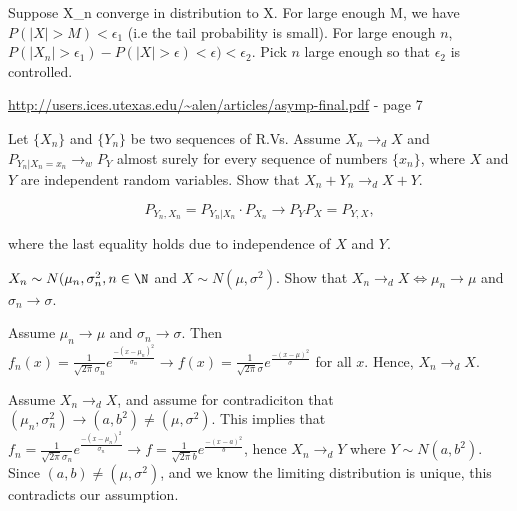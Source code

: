 \documentclass[]{book}
\theoremstyle{definition}
\theoremstyle{definition}
\theoremstyle{definition}
\theoremstyle{remark}
\let\BeginKnitrBlock\begin \let\EndKnitrBlock\end
\begin{document}
\BeginKnitrBlock{solution}[Ex 127 (a)]
\iffalse{} {Solution (Ex 127 (a)). } \fi{}Suppose X\_n converge in
distribution to X. For large enough M, we have
\(P(|X| > M) < \epsilon_1\) (i.e the tail probability is small). For
large enough \(n\),
\(P(|X_n| > \epsilon_1) - P(|X| > \epsilon) < \epsilon) < \epsilon_2\).
Pick \(n\) large enough so that \(\epsilon_2\) is controlled.

\url{http://users.ices.utexas.edu/~alen/articles/asymp-final.pdf} - page
7
\EndKnitrBlock{solution}

\BeginKnitrBlock{exercise}[Ex 128]
\protect\hypertarget{exr:unnamed-chunk-75}{}{\label{exr:unnamed-chunk-75}
\iffalse (Ex 128) \fi{} }
\EndKnitrBlock{exercise}

\BeginKnitrBlock{exercise}[Ex 137]
\protect\hypertarget{exr:unnamed-chunk-76}{}{\label{exr:unnamed-chunk-76}
\iffalse (Ex 137) \fi{} }Let \(\{X_n\}\) and \(\{Y_n\}\) be two
sequences of R.Vs. Assume \(X_n \to_d X\) and
\(P_{Y_n | X_n = x_n} \to_w P_Y\) almost surely for every sequence of
numbers \(\{x_n\}\), where \(X\) and \(Y\) are independent random
variables. Show that \(X_n + Y_n \to_d X + Y\).
\EndKnitrBlock{exercise}

\BeginKnitrBlock{solution}
\iffalse{} {Solution. } \fi{} \[
  P_{Y_n,X_n} = P_{Y_n|X_n}\cdot P_{X_n} \to P_Y P_X = P_{Y,X},
\]

where the last equality holds due to independence of \(X\) and \(Y\).
\EndKnitrBlock{solution}

\BeginKnitrBlock{exercise}[Ex 138]
\protect\hypertarget{exr:unnamed-chunk-78}{}{\label{exr:unnamed-chunk-78}
\iffalse (Ex 138) \fi{} }
\EndKnitrBlock{exercise}

\BeginKnitrBlock{exercise}[Ex 140]
\protect\hypertarget{exr:unnamed-chunk-79}{}{\label{exr:unnamed-chunk-79}
\iffalse (Ex 140) \fi{} }\(X_n \sim N(\mu_n, \sigma^2_n, n \in \N\) and
\(X \sim N(\mu, \sigma^2)\). Show that
\(X_n \to_d X \iff \mu_n \to \mu\) and \(\sigma_n \to \sigma\).
\EndKnitrBlock{exercise}

\BeginKnitrBlock{solution}
\iffalse{} {Solution. } \fi{}Assume \(\mu_n \to \mu\) and
\(\sigma_n \to \sigma\). Then
\(f_n(x) = \frac{1}{\sqrt{2\pi}\sigma_n}e^{\tfrac{-(x-\mu_n)^2}{\sigma_n}} \to f(x) = \frac{1}{\sqrt{2\pi}\sigma}e^{\tfrac{-(x-\mu)^2}{\sigma}}\)
for all \(x\). Hence, \(X_n \to_d X\).

Assume \(X_n \to_d X\), and assume for contradiciton that
\((\mu_n, \sigma^2_n) \to (a,b^2) \neq (\mu, \sigma^2)\). This implies
that
\(f_n = \frac{1}{\sqrt{2\pi}\sigma_n}e^{\tfrac{-(x-\mu_n)^2}{\sigma_n}} \to f = \frac{1}{\sqrt{2\pi}b}e^{\tfrac{-(x-a)^2}{b}}\),
hence \(X_n \to_d Y\) where \(Y \sim N(a,b^2)\). Since
\((a,b) \neq (\mu, \sigma^2)\), and we know the limiting distribution is
unique, this contradicts our assumption.
\EndKnitrBlock{solution}
\end{document}
